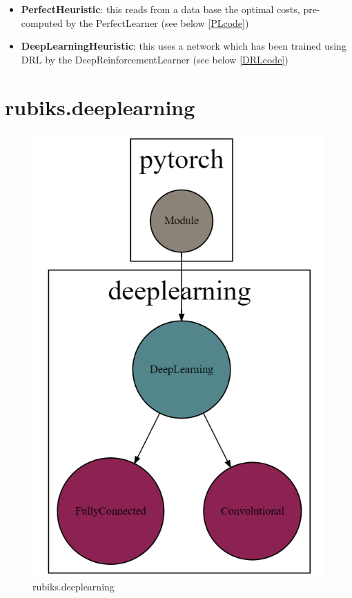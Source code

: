 \begin{itemize}
\item \textbf{PerfectHeuristic}: this reads from a data base the optimal costs, pre-computed by the PerfectLearner (see below \ref{PLcode})
\item \textbf{DeepLearningHeuristic}: this uses a network which has been trained using DRL by the DeepReinforcementLearner (see below \ref{DRLcode})
\end{itemize}



\section{rubiks.deeplearning}
\begin{figure}[H]
\centering
\includegraphics[scale=0.25]{./Figures/codebasedeeplearning}
\caption[Codebase]{rubiks.deeplearning}
\label{fig:Codebasedeeplearning}
\end{figure}
